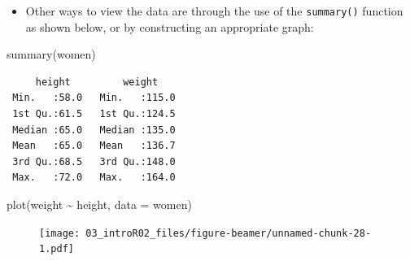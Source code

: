 \documentclass[
  9pt,
  a4paper,
  ignorenonframetext,
  notheorems]{beamer}
\newenvironment{Shaded}{\begin{snugshade}}{\end{snugshade}}
\newcommand{\AttributeTok}[1]{\textcolor[rgb]{0.40,0.45,0.13}{#1}}
\newcommand{\FunctionTok}[1]{\textcolor[rgb]{0.28,0.35,0.67}{#1}}
\newcommand{\NormalTok}[1]{\textcolor[rgb]{0.00,0.23,0.31}{#1}}
\newcommand{\SpecialCharTok}[1]{\textcolor[rgb]{0.37,0.37,0.37}{#1}}
\providecommand{\tightlist}{%
  \setlength{\itemsep}{0pt}\setlength{\parskip}{0pt}}\usepackage{longtable,booktabs,array}
\begin{document}
\begin{frame}[fragile]
\begin{itemize}
\tightlist
\item
  Other ways to view the data are through the use of the
  \texttt{summary()} function as shown below, or by constructing an
  appropriate graph:
\end{itemize}

\begin{Shaded}
\begin{Highlighting}[]
\FunctionTok{summary}\NormalTok{(women)}
\end{Highlighting}
\end{Shaded}

\begin{verbatim}
     height         weight     
 Min.   :58.0   Min.   :115.0  
 1st Qu.:61.5   1st Qu.:124.5  
 Median :65.0   Median :135.0  
 Mean   :65.0   Mean   :136.7  
 3rd Qu.:68.5   3rd Qu.:148.0  
 Max.   :72.0   Max.   :164.0  
\end{verbatim}

\begin{Shaded}
\begin{Highlighting}[]
\FunctionTok{plot}\NormalTok{(weight }\SpecialCharTok{\textasciitilde{}}\NormalTok{ height, }\AttributeTok{data =}\NormalTok{ women)}
\end{Highlighting}
\end{Shaded}

\begin{figure}

{\centering \texttt{[image: 03\_introR02\_files/figure-beamer/unnamed-chunk-28-1.pdf]}

}

\end{figure}
\end{frame}
\end{document}
